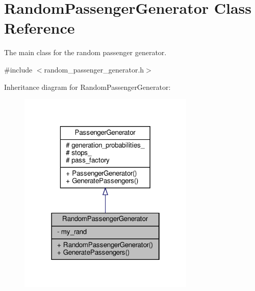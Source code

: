 \hypertarget{classRandomPassengerGenerator}{}\section{Random\+Passenger\+Generator Class Reference}
\label{classRandomPassengerGenerator}


The main class for the random passenger generator.  




{\ttfamily \#include $<$random\+\_\+passenger\+\_\+generator.\+h$>$}



Inheritance diagram for Random\+Passenger\+Generator\+:\nopagebreak
\begin{figure}[H]
\begin{center}
\leavevmode
\includegraphics[width=238pt]{classRandomPassengerGenerator__inherit__graph}
\end{center}
\end{figure}


